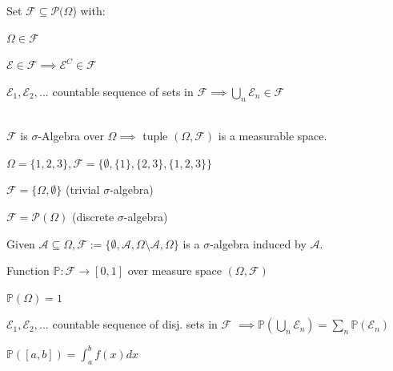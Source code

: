  Set \(\mathcal{F} \subseteq \mathcal{P}(\Omega\)) with:\\
\begin{enumerate*}[label=\textbullet, itemjoin={\quad}]
    \item \(\Omega\in\mathcal{F}\)
    \item \(\mathcal{E} \in \mathcal{F} \implies \mathcal{E}^C \in\mathcal{F}\) 
    \item \(\mathcal{E}_1, \mathcal{E}_2, ...\) countable sequence of sets in \(\mathcal{F} \implies \bigcup_n \mathcal{E}_n \in \mathcal{F}\)
\end{enumerate*}\\
\(\mathcal{F}\) is \(\sigma\)-Algebra over \(\Omega \implies\) tuple \((\Omega, \mathcal{F})\) is a \textcolor{mygreen}{measurable space}.
\example \\
\begin{enumerate*}[label=\textbullet, itemjoin={\quad}]
    \item \(\Omega=\{1, 2, 3\}, \mathcal{F}=\{\emptyset, \{1\}, \{2, 3\}, \{1, 2, 3\}\}\)
    \item \(\mathcal{F} = \{\Omega, \emptyset\}\) \textcolor{mygray}{(trivial \(\sigma\)-algebra)}
    \item \(\mathcal{F} = \mathcal{P}(\Omega)\) \textcolor{mygray}{(discrete \(\sigma\)-algebra)}
    \item Given \(\mathcal{A} \subseteq \Omega, \mathcal{F} := \{\emptyset, \mathcal{A}, \Omega\setminus\mathcal{A}, \Omega\}\) is a \(\sigma\)-algebra induced by \(\mathcal{A}\).
\end{enumerate*}

 Function \(\mathbb{P}: \mathcal{F} \rightarrow [0, 1]\) over measure space \((\Omega, \mathcal{F})\)\\
\begin{enumerate*}[label=\textbullet, itemjoin={\quad}]
    \item \(\mathbb{P}(\Omega) = 1\)
    \item \(\mathcal{E}_1, \mathcal{E}_2, ... \) countable sequence of disj. sets in $\mathcal{F}$ \(\implies \mathbb{P}(\bigcup_n\mathcal{E}_n) = \sum_n\mathbb{P}(\mathcal{E}_n)\)
\end{enumerate*}

\example \(\mathbb{P}([a,b])=\int_a^b f(x)dx\)



